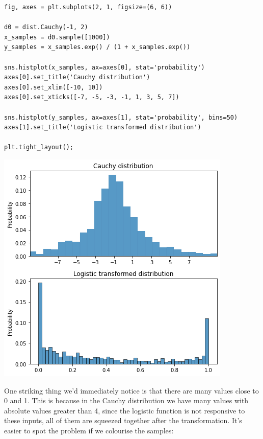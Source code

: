 \documentclass[11pt]{article}
\begin{document}
\begin{verbatim}
fig, axes = plt.subplots(2, 1, figsize=(6, 6))

d0 = dist.Cauchy(-1, 2)
x_samples = d0.sample([1000])
y_samples = x_samples.exp() / (1 + x_samples.exp())

sns.histplot(x_samples, ax=axes[0], stat='probability')
axes[0].set_title('Cauchy distribution')
axes[0].set_xlim([-10, 10])
axes[0].set_xticks([-7, -5, -3, -1, 1, 3, 5, 7])

sns.histplot(y_samples, ax=axes[1], stat='probability', bins=50)
axes[1].set_title('Logistic transformed distribution')

plt.tight_layout();
\end{verbatim}

\begin{center}
\includegraphics[width=.9\linewidth]{./.ob-jupyter/eebcd9efff12808b2adff3a877a3be9ed25281ee.png}
\end{center}

One striking thing we'd immediately notice is that there are many values close to 0 and 1. This is because in the Cauchy distribution we have many values with absolute values greater than 4, since the logistic function is not responsive to these inputs, all of them are squeezed together after the transformation. It's easier to spot the problem if we colourise the samples:
\end{document}
